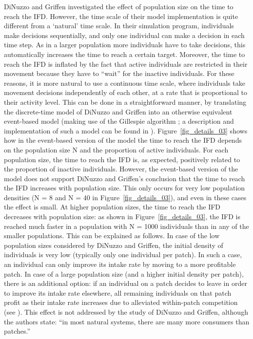 \begin{refsection}
	DiNuzzo and Griffen investigated the effect of population size on the time to reach the IFD.
	However, the time scale of their model implementation is quite different from a `natural' time scale.
	In their simulation program, individuals make decisions sequentially, and only one individual can make a decision in each time step.
	As in a larger population more individuals have to take decisions, this automatically increases the time to reach a certain target.
	Moreover, the time to reach the IFD is inflated by the fact that active individuals are restricted in their movement because they have to ``wait'' for the inactive individuals.
	For these reasons, it is more natural to use a continuous time scale, where individuals take movement decisions independently of each other, at a rate that is proportional to their activity level.
	This can be done in a straightforward manner, by translating the discrete-time model of DiNuzzo and Griffen into an otherwise equivalent event-based model (making use of the Gillespie algorithm \cite{gillespie1976}; a description and implementation of such a model can be found in \cite{netz2021b}).
	Figure~\ref{fig_details_03} shows how in the event-based version of the model the time to reach the IFD depends on the population size N and the proportion of active individuals.
	For each population size, the time to reach the IFD is, as expected, positively related to the proportion of inactive individuals.
	However, the event-based version of the model does not support DiNuzzo and Griffen's conclusion that the time to reach the IFD increases with population size.
	This only occurs for very low population densities (N = 8 and N = 40 in Figure~\ref{fig_details_03}), and even in these cases the effect is small.
	At higher population sizes, the time to reach the IFD decreases with population size: as shown in Figure~\ref{fig_details_03}, the IFD is reached much faster in a population with N = 1000 individuals than in any of the smaller populations.
	This can be explained as follows.
	In case of the low population sizes considered by DiNuzzo and Griffen, the initial density of individuals is very low (typically only one individual per patch).
	In such a case, an individual can only improve its intake rate by moving to a more profitable patch.
	In case of a large population size (and a higher initial density per patch), there is an additional option: if an individual on a patch decides to leave in order to improve its intake rate elsewhere, all remaining individuals on that patch profit as their intake rate increases due to alleviated within-patch competition (see \citep{wolf2008a}).
	This effect is not addressed by the study of DiNuzzo and Griffen, although the authors state: ``in most natural systems, there are many more consumers than patches.'' 


\end{refsection}
